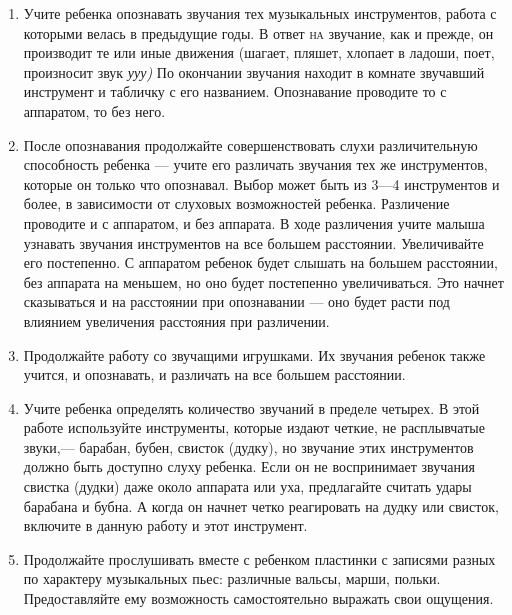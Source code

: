 \documentclass{book}
\renewcommand{\emph}[1]{\textit{#1}}
\begin{document}
\begin{enumerate}
\def\labelenumi{\arabic{enumi}.}
\item
  
  Учите ребенка опознавать звучания тех музыкальных инструментов, работа
  с которыми велась в предыдущие годы. В ответ \textsc{на} звучание, как
  и прежде, он производит те или иные движения (шагает, пляшет, хлопает
  в ладоши, поет, произносит звук \emph{ууу)} По окончании звучания
  находит в комнате звучавший инструмент и табличку с его названием.
  Опознавание проводите то с аппаратом, то без него.
  
\item
  
  После опознавания продолжайте совершенствовать слухи различительную
  способность ребенка --- учите его различать звучания тех же
  инструментов, которые он только что опознавал. Выбор может быть из
  3---4 инструментов и более, в зависимости от слуховых возможностей
  ребенка. Различение проводите и с аппаратом, и без аппарата. В ходе
  различения учите малыша узнавать звучания инструментов на все большем
  расстоянии. Увеличивайте его постепенно. С аппаратом ребенок будет
  слышать на большем расстоянии, без аппарата на меньшем, но оно будет
  постепенно увеличиваться. Это начнет сказываться и на расстоянии при
  опознавании --- оно будет расти под влиянием увеличения расстояния при
  различении.
  
\item
  
  Продолжайте работу со звучащими игрушками. Их звучания ребенок также
  учится, и опознавать, и различать на все большем расстоянии.
  
\item
  
  Учите ребенка определять количество звучаний в пределе четырех. В этой
  работе используйте инструменты, которые издают четкие, не расплывчатые
  звуки,--- барабан, бубен, свисток (дудку), но звучание этих
  инструментов должно быть доступно слуху ребенка. Если он не
  воспринимает звучания свистка (дудки) даже около аппарата или уха,
  предлагайте считать удары барабана и бубна. А когда он начнет четко
  реагировать на дудку или свисток, включите в данную работу и этот
  инструмент.
  
\item
  
  Продолжайте прослушивать вместе с ребенком пластинки с записями разных
  по характеру музыкальных пьес: различные вальсы, марши, польки.
  Предоставляйте ему возможность самостоятельно выражать свои ощущения.
  

\end{enumerate}
\end{document}
